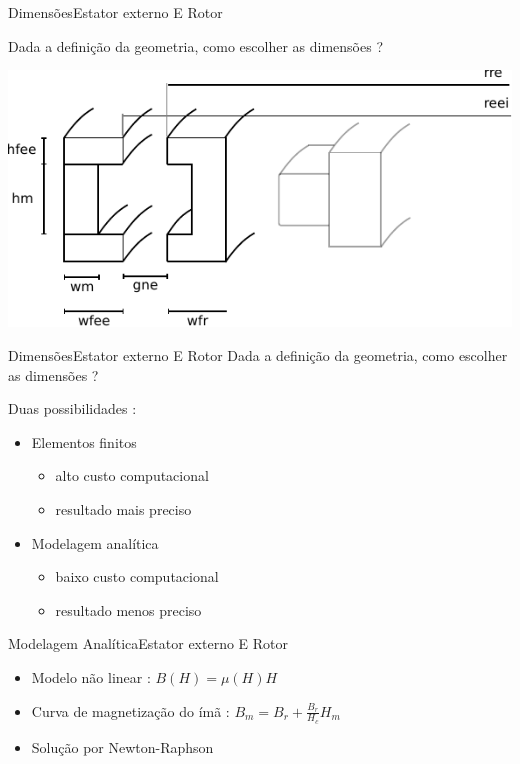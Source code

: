 \documentclass{beamer}
\begin{document}
\begin{frame}{Dimensões}{Estator externo E Rotor}

	Dada	 a definição da geometria, como escolher as dimensões ?
	
	\vspace{1cm}
\centering
  \includegraphics[width=0.7\linewidth]{modelo_dimensoes_passivo}
\end{frame}	

\begin{frame}{Dimensões}{Estator externo E Rotor}
	Dada	 a definição da geometria, como escolher as dimensões ?
	

	Duas possibilidades :
	\begin{itemize}
		\item Elementos finitos 
		\begin{itemize}
			\item alto custo computacional 
			\item resultado mais preciso
		\end{itemize}
		\item Modelagem analítica
		\begin{itemize}
			\item baixo custo computacional
			\item resultado menos preciso
		\end{itemize}
	\end{itemize}
	
\end{frame}

\begin{frame}{Modelagem Analítica}{Estator externo E Rotor}
	\begin{itemize}
	\item Modelo não linear : $B(H) = \mu(H) H$
	\item Curva de magnetização do ímã : $B_m = B_r + \frac{B_r}{H_c} H_m$
	\item Solução por Newton-Raphson
	\end{itemize}
	
	\centering{
	}
\end{frame}
\end{document}
